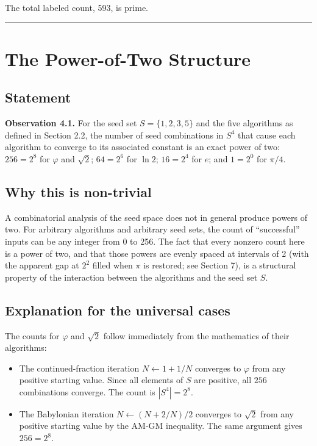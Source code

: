 \documentclass[12pt]{article}
\begin{document}
The total labeled count, 593, is prime.

\begin{center}\rule{0.5\linewidth}{0.5pt}\end{center}

\section{The Power-of-Two Structure}\label{the-power-of-two-structure}

\subsection{Statement}\label{statement}

\textbf{Observation 4.1.} For the seed set \(S = \{1, 2, 3, 5\}\) and
the five algorithms as defined in Section 2.2, the number of seed
combinations in \(S^4\) that cause each algorithm to converge to its
associated constant is an exact power of two: \(256 = 2^8\) for
\(\varphi\) and \(\sqrt{2}\); \(64 = 2^6\) for \(\ln 2\); \(16 = 2^4\)
for \(e\); and \(1 = 2^0\) for \(\pi/4\).

\subsection{Why this is non-trivial}\label{why-this-is-non-trivial}

A combinatorial analysis of the seed space does not in general produce
powers of two. For arbitrary algorithms and arbitrary seed sets, the
count of ``successful'' inputs can be any integer from 0 to 256. The
fact that every nonzero count here is a power of two, and that those
powers are evenly spaced at intervals of 2 (with the apparent gap at
\(2^2\) filled when \(\pi\) is restored; see Section 7), is a structural
property of the interaction between the algorithms and the seed set
\(S\).

\subsection{Explanation for the universal cases}\label{explanation-for-the-universal-cases}

The counts for \(\varphi\) and \(\sqrt{2}\) follow immediately from the
mathematics of their algorithms:

\begin{itemize}
\item
  The continued-fraction iteration \(N \leftarrow 1 + 1/N\) converges to
  \(\varphi\) from any positive starting value. Since all elements of
  \(S\) are positive, all \(256\) combinations converge. The count is
  \(|S^4| = 2^8\).
\item
  The Babylonian iteration \(N \leftarrow (N + 2/N)/2\) converges to
  \(\sqrt{2}\) from any positive starting value by the AM-GM inequality.
  The same argument gives \(256 = 2^8\).
\end{itemize}
\end{document}
